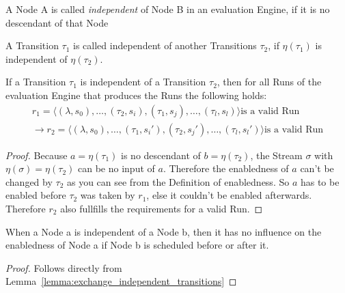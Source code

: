 \begin{definition}[name = Independence of Nodes]\label{def:node_independent}
  A Node A is called \emph{independent} of Node B in an evaluation Engine, if it is no descendant of that Node
\end{definition}

\begin{definition}[name = Independence of Transitions]\label{def:independence_transitions}
  A Transition \(\tau_1\) is called independent of another Transitions \(\tau_2\), if \(\eta(\tau_1)\) is independent of \(\eta(\tau_2)\).
\end{definition}

\begin{lemma}[name = Exchange of independent Transitions]\label{lemma:exchange_independent_transitions}
  If a Transition \(\tau_1\) is independent of a Transition \(\tau_2\), then for all Runs of the evaluation Engine that produces the Runs the following holds:
  \begin{align*}
    r_1 = \langle (\lambda, s_0), \dots, (\tau_2, s_i), (\tau_1, s_j), \dots, (\tau_l, s_l) \rangle \text{is a valid Run} \\
    \rightarrow r_2 = \langle (\lambda, s_0), \dots, (\tau_1, s_i'), (\tau_2, s_j'), \dots, (\tau_l, s_l') \rangle \text{is a valid Run}
  \end{align*}
\end{lemma}

\begin{proof}
Because \(a = \eta(\tau_1)\) is no descendant of \(b = \eta(\tau_2)\), the Stream \(\sigma\) with \(\eta(\sigma) = \eta(\tau_2)\) can be no input of \(a\).
  Therefore the enabledness of \(a\) can't be changed by \(\tau_2\) as you can see from the Definition of enabledness.
  So \(a\) has to be enabled before \(\tau_2\) was taken by \(r_1\), else it couldn't be enabled afterwards.
  Therefore \(r_2\) also fullfills the requirements for a valid Run.
\end{proof}

\begin{lemma}[name = Influence of independent Nodes]\label{lemma:independent_nodes}
  When a Node a is independent of a Node b, then it has no influence on the enabledness of Node a if Node b is scheduled before or after it.
\end{lemma}

\begin{proof}
  Follows directly from Lemma~\ref{lemma:exchange_independent_transitions}
\end{proof}

